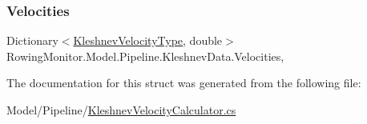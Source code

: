 \subsubsection{\texorpdfstring{Velocities}{Velocities}}
{\footnotesize\ttfamily Dictionary$<$\hyperlink{namespace_rowing_monitor_1_1_model_1_1_util_a45e0956b123d438555a1cb3997bd5cb4}{Kleshnev\+Velocity\+Type}, double$>$ Rowing\+Monitor.\+Model.\+Pipeline.\+Kleshnev\+Data.\+Velocities\hspace{0.3cm}{\ttfamily [get]}, {\ttfamily [set]}}



The documentation for this struct was generated from the following file\+:\begin{DoxyCompactItemize}
\item 
Model/\+Pipeline/\hyperlink{_kleshnev_velocity_calculator_8cs}{Kleshnev\+Velocity\+Calculator.\+cs}\end{DoxyCompactItemize}

